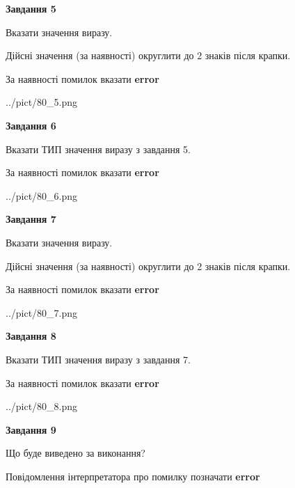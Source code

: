 \documentclass[11pt, ukrainian]{article}
\begin{document}
{\begin {large}
{\begin {center}\textbf{Завдання 5}\end {center}}\par
Вказати значення виразу. \par
Дійсні значення (за наявності) округлити до 2 знаків після крапки. \par
За наявності помилок вказати \textbf{error}

\begin{center}
	{../pict/80_5.png}
\end{center}
\newpage

{\begin {center}\textbf{Завдання 6}\end {center}}\par
Вказати ТИП значення виразу з завдання 5. \par
За наявності помилок вказати \textbf{error}

\begin{center}
	{../pict/80_6.png}
\end{center}
\newpage

{\begin {center}\textbf{Завдання 7}\end {center}}\par
Вказати значення виразу. \par
Дійсні значення (за наявності) округлити до 2 знаків після крапки. \par
За наявності помилок вказати \textbf{error}

\begin{center}
	{../pict/80_7.png}
\end{center}
\newpage

{\begin {center}\textbf{Завдання 8}\end {center}}\par
Вказати ТИП значення виразу з завдання 7. \par
За наявності помилок вказати \textbf{error}

\begin{center}
	{../pict/80_8.png}
\end{center}
\newpage

{\begin {center}\textbf{Завдання 9}\end {center}}\par
Що буде виведено за виконання? \par
Повідомлення інтерпретатора про помилку позначати \textbf{error}


\end{large}}
\end{document}
